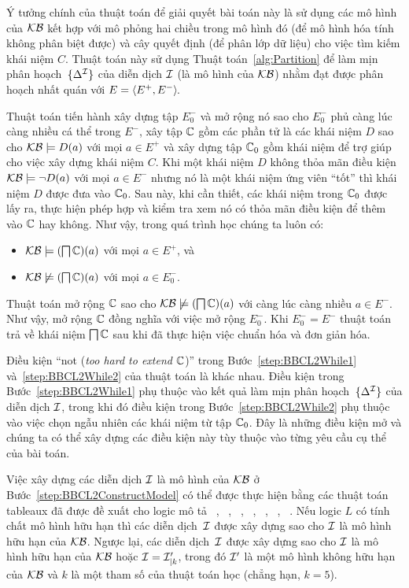 Ý tưởng chính của thuật toán \BBCLearnS để giải quyết bài toán này là sử dụng các mô hình của $\mathcal{KB}$ kết hợp với mô phỏng hai chiều trong mô hình đó (để mô hình hóa tính không phân biệt được) và cây quyết định (để phân lớp dữ liệu) cho việc tìm kiếm khái niệm $C$. Thuật toán này sử dụng Thuật toán~\ref{alg:Partition} để làm mịn phân hoạch~$\{\Delta^{\mathcal{I}}\}$ của diễn dịch $\mathcal{I}$ (là mô hình của $\mathcal{KB}$) nhằm đạt được phân hoạch nhất quán với $E = \left\langle E^+, E^-\right\rangle\!$.

Thuật toán tiến hành xây dựng tập $E^-_0$ và mở rộng nó sao cho $E^-_0$ phủ càng lúc càng nhiều cá thể trong $E^-$, xây tập $\mathbb{C}$ gồm các phần tử là các khái niệm $D$ sao cho $\mathcal{KB} \models D(a)$ với mọi $a \in E^+$ và xây dựng tập $\mathbb{C}_0$ gồm khái niệm để trợ giúp cho việc xây dựng khái niệm $C$. 
Khi một khái niệm $D$ không thỏa mãn điều kiện $\mathcal{KB} \models \neg D(a)$ với mọi $a \in E^-$ nhưng nó là một khái niệm ứng viên ``tốt'' thì khái niệm $D$ được đưa vào $\mathbb{C}_0$. Sau này, khi cần thiết, các khái niệm trong $\mathbb{C}_0$ được lấy ra, thực hiện phép hợp và kiểm tra xem nó có thỏa mãn điều kiện để thêm vào $\mathbb{C}$ hay không. Như vậy, trong quá trình học chúng ta luôn có:
\begin{itemize}
	\item $\mathcal{KB} \models (\bigsqcap\mathbb{C})(a)$ với mọi $a \in E^+$, và
	\item $\mathcal{KB} \not\models (\bigsqcap\mathbb{C})(a)$ với mọi $a \in E^-_0$. 
\end{itemize}

Thuật toán mở rộng $\mathbb{C}$ sao cho $\mathcal{KB} \not\models(\bigsqcap\mathbb{C})(a)$ với càng lúc càng nhiều $a \in E^-$. Như vậy, mở rộng $\mathbb{C}$ đồng nghĩa với việc mở rộng $E^-_0$. Khi $E^-_0 = E^-$ thuật toán trả về khái niệm $\bigsqcap\mathbb{C}$ sau khi đã thực hiện việc chuẩn hóa và đơn giản hóa.

Điều kiện ``not (\textit{too hard to extend} $\mathbb{C}$)'' trong Bước~\ref{step:BBCL2While1} và~\ref{step:BBCL2While2} của thuật toán \BBCLearnS là khác nhau. Điều kiện trong Bước~\ref{step:BBCL2While1} phụ thuộc vào kết quả làm mịn phân hoạch~$\{\Delta^{\mathcal{I}}\}$ của diễn dịch $\mathcal{I}$, trong khi đó điều kiện trong Bước~\ref{step:BBCL2While2} phụ thuộc vào việc chọn ngẫu nhiên các khái niệm từ tập $\mathbb{C}_0$. Đây là những điều kiện mở và chúng ta có thể xây dựng các điều kiện này tùy thuộc vào từng yêu cầu cụ thể của bài toán.

Việc xây dựng các diễn dịch $\mathcal{I}$ là mô hình của $\mathcal{KB}$ ở Bước~\ref{step:BBCL2ConstructModel} có thể được thực hiện bằng các thuật toán tableaux đã được đề xuất cho logic mô tả \ALC~\cite{Nguyen2009}, \ALCI~\cite{Nguyen2011B}, \SH~\cite{Nguyen2010}, \SHI~\cite{Horrocks1999,Nguyen2011C}, \SHIQ~\cite{Horrocks2000B}, \SHOIQ~\cite{Horrocks2007B}, \SROIQ~\cite{Horrocks2006}. Nếu logic $L$ có tính chất mô hình hữu hạn thì các diễn dịch~$\mathcal{I}$ được xây dựng sao cho $\mathcal{I}$ là mô hình hữu hạn của $\mathcal{KB}$. Ngược lại, các diễn dịch~$\mathcal{I}$ được xây dựng sao cho $\mathcal{I}$ là mô hình hữu hạn của $\mathcal{KB}$ hoặc $\mathcal{I} = \mathcal{I}'_{\mid k}$, trong đó $\mathcal{I}'$ là một mô hình không hữu hạn của $\mathcal{KB}$ và $k$ là một tham số của thuật toán học (chẳng hạn, $k = 5$).

